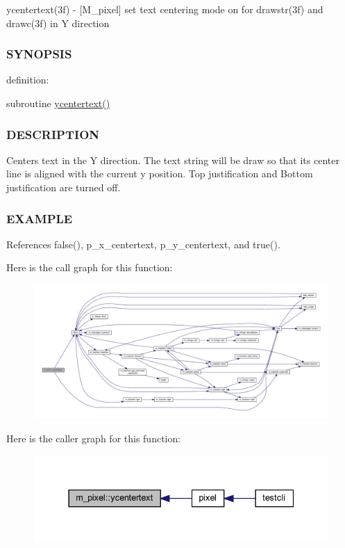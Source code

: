 ycentertext(3f) -\/ \mbox{[}M\+\_\+pixel\mbox{]} set text centering mode on for drawstr(3f) and drawc(3f) in Y direction 

\subsubsection*{S\+Y\+N\+O\+P\+S\+IS}

definition\+:

subroutine \hyperlink{namespacem__pixel_a2e32105b5e77abf38768fec6b11376a3}{ycentertext()}

\subsubsection*{D\+E\+S\+C\+R\+I\+P\+T\+I\+ON}

Centers text in the Y direction. The text string will be draw so that it\textquotesingle{}s center line is aligned with the current y position. Top justification and Bottom justification are turned off.

\subsubsection*{E\+X\+A\+M\+P\+LE}

References false(), p\+\_\+x\+\_\+centertext, p\+\_\+y\+\_\+centertext, and true().

Here is the call graph for this function\+:
\nopagebreak
\begin{figure}[H]
\begin{center}
\leavevmode
\includegraphics[width=350pt]{namespacem__pixel_a2e32105b5e77abf38768fec6b11376a3_cgraph}
\end{center}
\end{figure}
Here is the caller graph for this function\+:
\nopagebreak
\begin{figure}[H]
\begin{center}
\leavevmode
\includegraphics[width=337pt]{namespacem__pixel_a2e32105b5e77abf38768fec6b11376a3_icgraph}
\end{center}
\end{figure}


